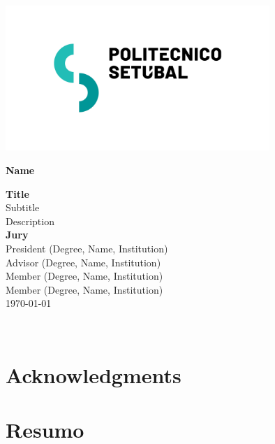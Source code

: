 \documentclass[12pt]{report} %
\begin{document}
\begin{titlepage}
    \begin{center}
        \includegraphics[width=0.75\textwidth]{images/IPSLogo.png}
    \end{center}
    \begin{minipage}[t]{0.4\textwidth}
        \raggedleft
        \LARGE
        \textbf{Name}
    \end{minipage}
    \hfill
    \begin{minipage}[t]{0.5\textwidth}
        \LARGE
        \textbf{Title} \\[2cm]
        \normalsize
        Subtitle \\[4cm]
        Description \\[2cm]
        \textbf{Jury} \\
        President (Degree, Name, Institution) \\
        Advisor (Degree, Name, Institution) \\
        Member (Degree, Name, Institution) \\
        Member (Degree, Name, Institution) \\[2cm]
        \monthyeardate\today \\
    \end{minipage}
\end{titlepage}
\restoregeometry

\newpage
\

\newpage
\chapter*{Acknowledgments}

\newpage
\chapter*{Resumo}
\end{document}
